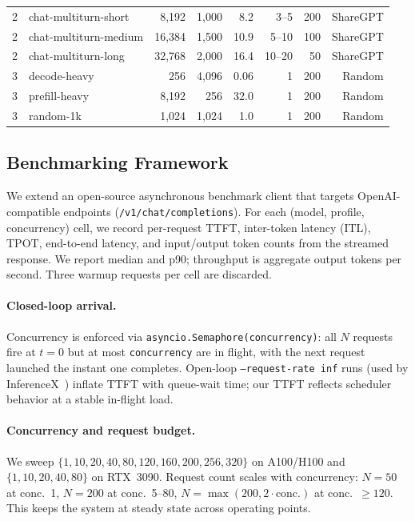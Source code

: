 \begin{table}[t]
\begin{tabular}{llrrrrrr}
2 & chat-multiturn-short             & 8{,}192  & 1{,}000 & 8.2 & 3--5    & 200 & ShareGPT \\
2 & chat-multiturn-medium            & 16{,}384 & 1{,}500 & 10.9 & 5--10  & 100 & ShareGPT \\
2 & chat-multiturn-long              & 32{,}768 & 2{,}000 & 16.4 & 10--20 & 50  & ShareGPT \\
\midrule
3 & decode-heavy                     & 256      & 4{,}096 & 0.06 & 1     & 200 & Random \\
3 & prefill-heavy                    & 8{,}192  & 256   & 32.0 & 1       & 200 & Random \\
3 & random-1k                        & 1{,}024  & 1{,}024 & 1.0 & 1       & 200 & Random \\
\bottomrule
\end{tabular}
\end{table}

\FloatBarrier

\subsection{Benchmarking Framework}
\label{sec:framework}

We extend an open-source asynchronous benchmark client that targets OpenAI-compatible endpoints (\texttt{/v1/chat/completions}). For each (model, profile, concurrency) cell, we record per-request TTFT, inter-token latency (ITL), TPOT, end-to-end latency, and input/output token counts from the streamed response. We report median and p90; throughput is aggregate output tokens per second. Three warmup requests per cell are discarded.

\paragraph{Closed-loop arrival.} Concurrency is enforced via \texttt{asyncio.Semaphore(concurrency)}: all $N$ requests fire at $t{=}0$ but at most \texttt{concurrency} are in flight, with the next request launched the instant one completes. Open-loop \texttt{--request-rate inf} runs (used by InferenceX~\citep{inferencex}) inflate TTFT with queue-wait time; our TTFT reflects scheduler behavior at a stable in-flight load.

\paragraph{Concurrency and request budget.} We sweep $\{1, 10, 20, 40, 80, 120, 160, 200, 256, 320\}$ on A100/H100 and $\{1, 10, 20, 40, 80\}$ on RTX~3090. Request count scales with concurrency: $N{=}50$ at conc.\ 1, $N{=}200$ at conc.\ 5--80, $N{=}\max(200, 2\cdot\text{conc.})$ at conc.\ ${\geq}120$. This keeps the system at steady state across operating points.

